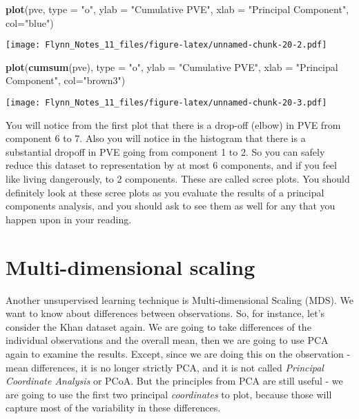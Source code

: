 \documentclass[]{article}
\newenvironment{Shaded}{\begin{snugshade}}{\end{snugshade}}
\newcommand{\KeywordTok}[1]{\textcolor[rgb]{0.13,0.29,0.53}{\textbf{#1}}}
\newcommand{\DataTypeTok}[1]{\textcolor[rgb]{0.13,0.29,0.53}{#1}}
\newcommand{\StringTok}[1]{\textcolor[rgb]{0.31,0.60,0.02}{#1}}
\newcommand{\NormalTok}[1]{#1}
\begin{document}
\begin{Shaded}
\begin{Highlighting}[]
\KeywordTok{plot}\NormalTok{(pve, }\DataTypeTok{type =} \StringTok{"o"}\NormalTok{, }\DataTypeTok{ylab =} \StringTok{"Cumulative PVE"}\NormalTok{, }\DataTypeTok{xlab =} \StringTok{"Principal Component"}\NormalTok{, }\DataTypeTok{col=}\StringTok{"blue"}\NormalTok{)}
\end{Highlighting}
\end{Shaded}

\texttt{[image: Flynn\_Notes\_11\_files/figure-latex/unnamed-chunk-20-2.pdf]}

\begin{Shaded}
\begin{Highlighting}[]
\KeywordTok{plot}\NormalTok{(}\KeywordTok{cumsum}\NormalTok{(pve), }\DataTypeTok{type =} \StringTok{"o"}\NormalTok{, }\DataTypeTok{ylab =} \StringTok{"Cumulative PVE"}\NormalTok{, }\DataTypeTok{xlab =} \StringTok{"Principal Component"}\NormalTok{, }\DataTypeTok{col=}\StringTok{"brown3"}\NormalTok{)}
\end{Highlighting}
\end{Shaded}

\texttt{[image: Flynn\_Notes\_11\_files/figure-latex/unnamed-chunk-20-3.pdf]}

You will notice from the first plot that there is a drop-off (elbow) in
PVE from component 6 to 7. Also you will notice in the histogram that
there is a substantial dropoff in PVE going from component 1 to 2. So
you can safely reduce this dataset to representation by at most 6
components, and if you feel like living dangerously, to 2 components.
These are called scree plots. You should definitely look at these scree
plots as you evaluate the results of a principal components analysis,
and you should ask to see them as well for any that you happen upon in
your reading.

\section{Multi-dimensional scaling}\label{multi-dimensional-scaling}

Another unsupervised learning technique is Multi-dimensional Scaling
(MDS). We want to know about differences between observations. So, for
instance, let's consider the Khan dataset again. We are going to take
differences of the individual observations and the overall mean, then we
are going to use PCA again to examine the results. Except, since we are
doing this on the observation - mean differences, it is no longer
strictly PCA, and it is not called \emph{Principal Coordinate Analysis}
or PCoA. But the principles from PCA are still useful - we are going to
use the first two principal \emph{coordinates} to plot, because those
will capture most of the variability in these differences.
\end{document}
